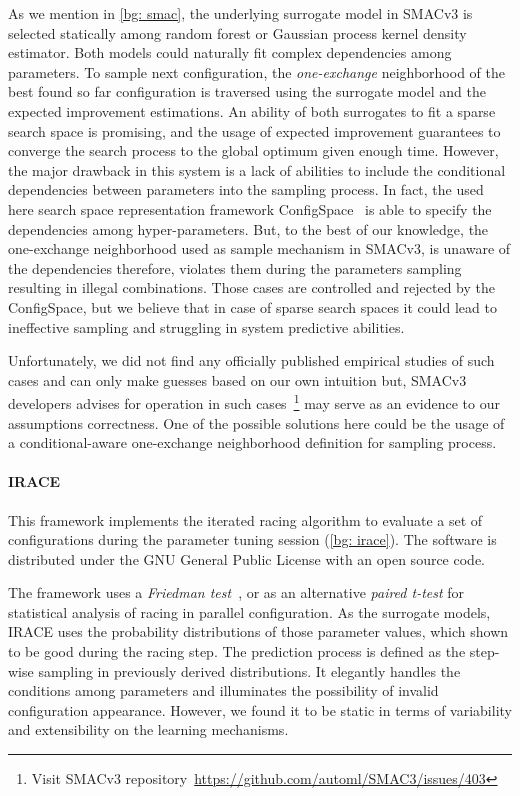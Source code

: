 As we mention in \cref{bg: smac}, the underlying surrogate model in SMACv3 is selected statically among random forest or Gaussian process kernel density estimator. Both models could naturally fit complex dependencies among parameters. To sample next configuration, the \emph{one-exchange} neighborhood of the best found so far configuration is traversed using the surrogate model and the expected improvement estimations.
An ability of both surrogates to fit a sparse search space is promising, and the usage of expected improvement guarantees to converge the search process to the global optimum given enough time. However, the major drawback in this system is a lack of abilities to include the conditional dependencies between parameters into the sampling process. In fact, the used here search space representation framework ConfigSpace~\cite{configspace} is able to specify the dependencies among hyper-parameters. But, to the best of our knowledge, the one-exchange neighborhood used as sample mechanism in SMACv3, is unaware of the dependencies therefore, violates them during the parameters sampling resulting in illegal combinations. Those cases are controlled and rejected by the ConfigSpace, but we believe that in case of sparse search spaces it could lead to ineffective sampling and struggling in system predictive abilities. 

Unfortunately, we did not find any officially published empirical studies of such cases and can only make guesses based on our own intuition but, SMACv3 developers advises for operation in such cases~\footnote{Visit SMACv3 repository~\url{https://github.com/automl/SMAC3/issues/403}} may serve as an evidence to our assumptions correctness. One of the possible solutions here could be the usage of a conditional-aware one-exchange neighborhood definition for sampling process.


\paragraph{IRACE} This framework implements the iterated racing algorithm to evaluate a set of configurations during the parameter tuning session (\cref{bg: irace}). The software is distributed under the GNU General Public License with an open source code.

The framework uses a \emph{Friedman test}~\cite{conover1980practical}, or as an alternative \emph{paired t-test} for statistical analysis of racing in parallel configuration. As the surrogate models, IRACE uses the probability distributions of those parameter values, which shown to be good during the racing step. The prediction process is defined as the step-wise sampling in previously derived distributions. It elegantly handles the conditions among parameters and illuminates the possibility of invalid configuration appearance. However, we found it to be static in terms of variability and extensibility on the learning mechanisms.

